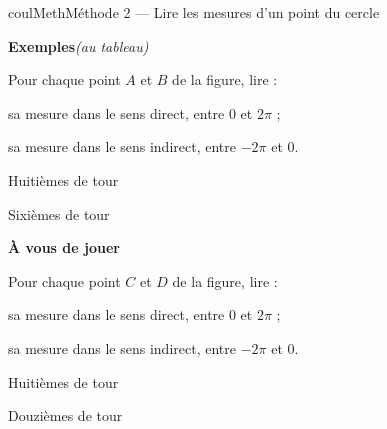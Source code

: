 \documentclass[11pt,a4paper]{article}
\makeatletter
\newcounter{lycee@signet}
\newcommand{\signet}[3][]{\stepcounter{lycee@signet}%
  \edef\lycee@dest{\if\relax\detokenize{#1}\relax
    signet.\arabic{lycee@signet}\else#1\fi}%
  \hypertarget{\lycee@dest}{}\bookmark[level=#2,dest=\lycee@dest]{#3}}
\newcounter{methode}
\newenvironment{methodebox}[1][Méthode]{\stepcounter{methode}%
  \begin{boitecours}[phantom={\signet[methode-\arabic{methode}]{2}{#1}}]{coulMeth}{#1}}%
  {\end{boitecours}}
\newcommand{\etape}[1]{\par\smallskip\textbf{\color{coulMeth}#1}\par\nobreak\smallskip}
\newcommand{\autableau}{\hfill{\footnotesize\itshape\color{black!45}(au tableau)}}
\newcommand{\etapeexemples}{%
    \par\smallskip\textbf{\color{coulMeth}Exemples}\autableau\par\nobreak\smallskip}
\makeatother
\begin{document}
\begin{methodebox}[Méthode 2 --- Lire les mesures d'un point du cercle]
\etapeexemples
\begin{minipage}[c]{0.40\linewidth}\raggedright
Pour chaque point $A$ et $B$ de la figure, lire :
\begin{questions}[label=\alph*)]
  \item sa mesure dans le sens direct, entre $0$ et $2\pi$ ;
  \item sa mesure dans le sens indirect, entre $-2\pi$ et $0$.
\end{questions}
\end{minipage}\hfill
\begin{minipage}[c]{0.28\linewidth}\centering
Huitièmes de tour\par
{}
\end{minipage}\hfill
\begin{minipage}[c]{0.28\linewidth}\centering
Sixièmes de tour\par
{}
\end{minipage}

\etape{À vous de jouer}
\begin{minipage}[c]{0.40\linewidth}\raggedright
Pour chaque point $C$ et $D$ de la figure, lire :
\begin{questions}[label=\alph*)]
  \item sa mesure dans le sens direct, entre $0$ et $2\pi$ ;
  \item sa mesure dans le sens indirect, entre $-2\pi$ et $0$.
\end{questions}
\end{minipage}\hfill
\begin{minipage}[c]{0.28\linewidth}\centering
Huitièmes de tour\par
{}
\end{minipage}\hfill
\begin{minipage}[c]{0.28\linewidth}\centering
Douzièmes de tour\par
{}
\end{minipage}

\end{methodebox}
\end{document}
